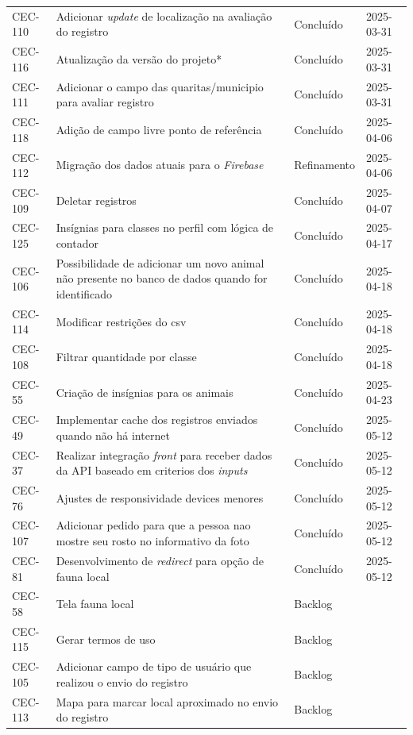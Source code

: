 \begin{longtable}{@{}lp{7cm}ll@{}}
CEC-110 & Adicionar \textit{update} de localização na avaliação do registro & Concluído & 2025-03-31 \\
CEC-116 & Atualização da versão do projeto* & Concluído & 2025-03-31 \\
CEC-111 & Adicionar o campo das quaritas/municipio para avaliar registro & Concluído & 2025-03-31 \\
CEC-118 & Adição de campo livre ponto de referência & Concluído & 2025-04-06 \\
CEC-112 & Migração dos dados atuais para o \textit{Firebase} & Refinamento & 2025-04-06 \\
CEC-109 & Deletar registros & Concluído & 2025-04-07 \\
CEC-125 & Insígnias para classes no perfil com lógica de contador & Concluído & 2025-04-17 \\
CEC-106 & Possibilidade de adicionar um novo animal não presente no banco de dados quando for identificado & Concluído & 2025-04-18 \\
CEC-114 & Modificar restrições do csv & Concluído & 2025-04-18 \\
CEC-108 & Filtrar quantidade por classe & Concluído & 2025-04-18 \\
CEC-55 & Criação de insígnias para os animais & Concluído & 2025-04-23 \\
CEC-49 & Implementar cache dos registros enviados quando não há internet & Concluído & 2025-05-12 \\
CEC-37 & Realizar integração \textit{front} para receber dados da API baseado em criterios dos \textit{inputs} & Concluído & 2025-05-12 \\
CEC-76 & Ajustes de responsividade devices menores & Concluído & 2025-05-12 \\
CEC-107 & Adicionar pedido para que a pessoa nao mostre seu rosto no informativo da foto & Concluído & 2025-05-12 \\
CEC-81 & Desenvolvimento de \textit{redirect} para opção de fauna local & Concluído & 2025-05-12 \\
CEC-58 & Tela fauna local & Backlog & \\
CEC-115 & Gerar termos de uso & Backlog & \\
CEC-105 & Adicionar campo de tipo de usuário que realizou o envio do registro & Backlog & \\
CEC-113 & Mapa para marcar local aproximado no envio do registro & Backlog & \\
\end{longtable}